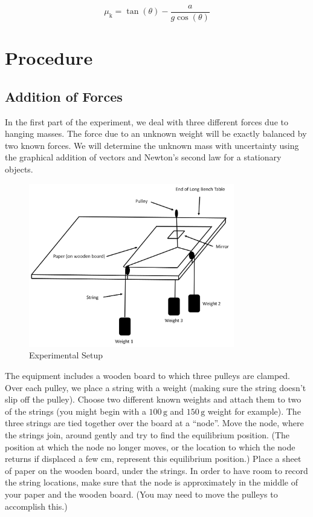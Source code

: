 \begin{equation}
\mu_\text{k} = \tan(\theta)-\frac{a}{g \cos(\theta)}
\end{equation}

\section{Procedure}

\subsection{Addition of Forces}

In the first part of the experiment, we deal with three different forces due to hanging masses. The force due to an unknown weight will be exactly balanced by two known forces. We will determine the unknown mass with uncertainty using the graphical addition of vectors and Newton's second law for a stationary objects. \begin{figure}[h]
    \begin{center}
        \includegraphics[width=0.8\textwidth]{./Exp3/pic/image14.jpg}
    \end{center}
    \caption{Experimental Setup}
    \label{fig:setup}
\end{figure}

The equipment includes a wooden board to which three pulleys are clamped. Over each pulley, we place a string with a weight (making sure the string doesn't slip off the pulley). Choose two different known weights and attach them to two of the strings (you might begin with a $100\,\mathrm{g}$ and $150\,\mathrm{g}$ weight for example). The three strings are tied together over the board at a ``node''. Move the node, where the strings join, around gently and try to find the equilibrium position. (The position at which the node no longer moves, or the location to which the node returns if displaced a few cm, represent this equilibrium position.)  Place a sheet of paper on the wooden board, under the strings. In order to have room to record the string locations, make sure that the node is approximately in the middle of your paper and the wooden board. (You may need to move the pulleys to accomplish this.) \myskip

